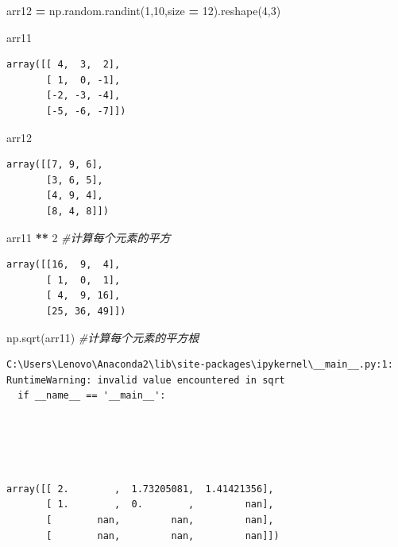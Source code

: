 \documentclass[]{article}
\newenvironment{Shaded}{\begin{snugshade}}{\end{snugshade}}
\newcommand{\DecValTok}[1]{\textcolor[rgb]{0.00,0.00,0.81}{#1}}
\newcommand{\CommentTok}[1]{\textcolor[rgb]{0.56,0.35,0.01}{\textit{#1}}}
\newcommand{\OperatorTok}[1]{\textcolor[rgb]{0.81,0.36,0.00}{\textbf{#1}}}
\newcommand{\NormalTok}[1]{#1}
\begin{document}
\begin{Shaded}
\begin{Highlighting}[]
\NormalTok{arr12 }\OperatorTok{=}\NormalTok{ np.random.randint(}\DecValTok{1}\NormalTok{,}\DecValTok{10}\NormalTok{,size }\OperatorTok{=} \DecValTok{12}\NormalTok{).reshape(}\DecValTok{4}\NormalTok{,}\DecValTok{3}\NormalTok{)}
\end{Highlighting}
\end{Shaded}

\begin{Shaded}
\begin{Highlighting}[]
\NormalTok{arr11}
\end{Highlighting}
\end{Shaded}

\begin{verbatim}
array([[ 4,  3,  2],
       [ 1,  0, -1],
       [-2, -3, -4],
       [-5, -6, -7]])
\end{verbatim}

\begin{Shaded}
\begin{Highlighting}[]
\NormalTok{arr12}
\end{Highlighting}
\end{Shaded}

\begin{verbatim}
array([[7, 9, 6],
       [3, 6, 5],
       [4, 9, 4],
       [8, 4, 8]])
\end{verbatim}

\begin{Shaded}
\begin{Highlighting}[]
\NormalTok{arr11 }\OperatorTok{**} \DecValTok{2} \CommentTok{#计算每个元素的平方}
\end{Highlighting}
\end{Shaded}

\begin{verbatim}
array([[16,  9,  4],
       [ 1,  0,  1],
       [ 4,  9, 16],
       [25, 36, 49]])
\end{verbatim}

\begin{Shaded}
\begin{Highlighting}[]
\NormalTok{np.sqrt(arr11) }\CommentTok{#计算每个元素的平方根}
\end{Highlighting}
\end{Shaded}

\begin{verbatim}
C:\Users\Lenovo\Anaconda2\lib\site-packages\ipykernel\__main__.py:1: RuntimeWarning: invalid value encountered in sqrt
  if __name__ == '__main__':





array([[ 2.        ,  1.73205081,  1.41421356],
       [ 1.        ,  0.        ,         nan],
       [        nan,         nan,         nan],
       [        nan,         nan,         nan]])
\end{verbatim}
\end{document}
